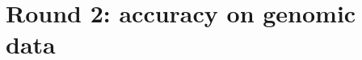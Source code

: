 \documentclass{beamer}
\begin{document}











\section{Round 2: accuracy on genomic data}
\end{document}
